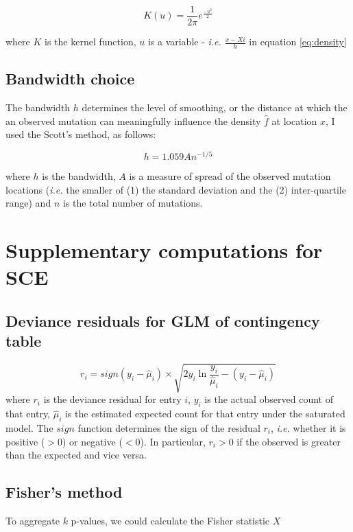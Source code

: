 \begin{equation}
    K(u) = \frac{1}{2\pi} e^{\frac{-u^2}{2}}
    \label{eq:gaussian}
\end{equation}

where $K$ is the kernel function, $u$ is a variable - \textit{i.e.} $\frac{x-X{i}}{h}$ in equation \ref{eq:density}

\subsection{Bandwidth choice}
The bandwidth $h$ determines the level of smoothing, or the distance at which the an observed mutation can meaningfully influence the density $\hat{f}$ at location $x$, I used the Scott's method, as follows:

\begin{equation}
    h = 1.059 A n^{-1/5}
    \label{eq:bandwidth}
\end{equation}

where $h$ is the bandwidth, $A$ is a measure of spread of the observed mutation locations (\textit{i.e.} the smaller of (1) the standard deviation and the (2) inter-quartile range) and $n$ is the total number of mutations.


\newpage
\section{Supplementary computations for SCE}

\subsection{Deviance residuals for GLM of contingency table}
\begin{equation}
    r_i = sign(y_i - \hat{\mu}_i) \times \sqrt{2y_i\ln{\frac{y_i}{\hat{\mu}_i}} - (y_i - \hat{\mu}_i)}
    \label{eq:dev_res}
\end{equation}
where $r_i$ is the deviance residual for entry $i$, $y_i$ is the actual observed count of that entry, $\hat{\mu}_i$ is the estimated expected count for that entry under the saturated model. The $sign$ function determines the sign of the residual $r_i$, \textit{i.e.} whether it is positive ($>$0) or negative ($<$0). In particular, $r_i>0$ if the observed is greater than the expected and vice versa. 

\subsection{Fisher's method}\label{apdx:fisher}
To aggregate $k$ p-values, we could calculate the Fisher statistic $X$

